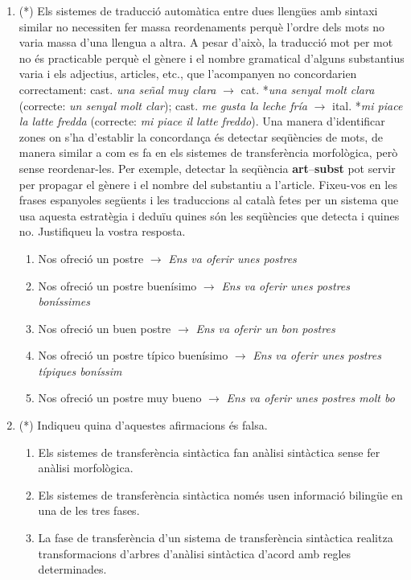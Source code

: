 \begin{enumerate}
    \item (*) \label{ex:postres} Els sistemes de traducció automàtica entre dues llengües amb
      sintaxi similar no necessiten fer massa reordenaments perquè
      l'ordre dels mots no varia massa d'una llengua a altra. A pesar
      d'això, la traducció mot per mot no és practicable perquè el
      gènere i el nombre gramatical d'alguns substantius varia i els
      adjectius, articles, etc., que l'acompanyen no concordarien
      correctament: cast. {\em una señal muy clara\/} $\rightarrow$
      cat. *{\em una senyal molt clara} (correcte: {\em un senyal molt
        clar\/}); cast. {\em me gusta la leche fría} $\rightarrow$
      ital. *{\em mi piace la latte fredda\/} (correcte: {\em mi piace
        il latte freddo}). Una manera d'identificar zones on s'ha
      d'establir la concordança és detectar seqüències de mots, de
      manera similar a com es fa en els sistemes de transferència
      morfològica, però sense reordenar-les. Per exemple, detectar la
      seqüència {\bf art}--{\bf subst} pot servir per propagar el
      gènere i el nombre del substantiu a l'article. Fixeu-vos en les
      frases espanyoles següents i les traduccions al català fetes
      per un sistema que usa aquesta estratègia i deduïu quines són
      les seqüències que detecta i quines no. Justifiqueu la vostra
      resposta.
\begin{enumerate}
\item {\sf Nos ofreció un postre} $\rightarrow$ {\em Ens va oferir unes
    postres\/}
\item {\sf Nos ofreció un postre buenísimo} $\rightarrow$ {\em Ens va
    oferir unes postres boníssimes\/}
\item {\sf Nos ofreció un buen postre} $\rightarrow$ {\em *Ens va
    oferir un bon postres\/}
\item {\sf Nos ofreció un postre típico buenísimo\/} $\rightarrow$
  {\em *Ens va oferir unes postres típiques boníssim\/}
\item {\sf Nos ofreció un postre muy bueno} $\rightarrow$ {\em *Ens va
    oferir unes postres molt bo\/}
\end{enumerate}

\item 
(*)   Indiqueu quina d'aquestes afirmacions és falsa.
   
\begin{enumerate}
\item Els sistemes de transferència sintàctica fan
     anàlisi sintàctica sense fer anàlisi morfològica.
\item Els sistemes de transferència sintàctica només usen
     informació bilingüe en una de les tres fases.
\item La fase de transferència d'un sistema de transferència
     sintàctica realitza transformacions d'arbres d'anàlisi sintàctica
     d'acord amb regles determinades.
\end{enumerate}



\end{enumerate}

